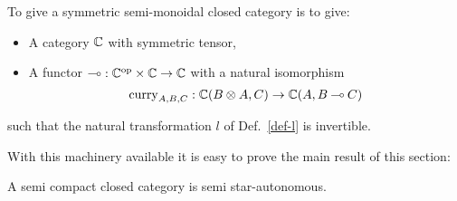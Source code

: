 \documentclass{robinthesisdraft}
\begin{document}
\begin{propn}
        To give a symmetric semi-monoidal closed category is to give:
        \begin{itemize}
        \item A category $\mathbb{C}$ with symmetric tensor,
        \item A functor $\mathbin{\multimap}:\mathbb{C}^\mathrm{op}\times\mathbb{C}\to\mathbb{C}$ with a natural isomorphism
                \[
                        \curry_{A,B,C}:\C(B\tn A,C) \to \C(A, B\lolli C)
                \]
        \end{itemize}
        such that the natural transformation
        $l$ of Def.~\ref{def-l}
        is invertible.
\end{propn}
\noindent With this machinery available it is easy to prove the main result of this section:
\begin{propn}\label{prop-ssa}
	A semi compact closed category is semi star-autonomous.
\end{propn} 
\end{document}
